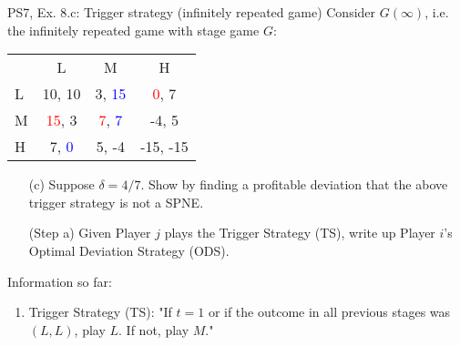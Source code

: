 \begin{frame}{PS7, Ex. 8.c: Trigger strategy (infinitely repeated game)}
    Consider $G(\infty)$, i.e. the infinitely repeated game with stage game $G$: \vspace{-6pt}
    \begin{table}
      \begin{tabular}{l|c|c|c|}
        \multicolumn{1}{c}{} & \multicolumn{1}{c}{L} & \multicolumn{1}{c}{M} & \multicolumn{1}{c}{H} \\\cline{2-4}
        L & 10, 10 & 3, \textcolor{blue}{15} & \textcolor{red}{0}, 7 \\\cline{2-4}
        M & \textcolor{red}{15}, 3 & \textcolor{red}{7}, \textcolor{blue}{7} & -4, 5 \\\cline{2-4}
        H & 7, \textcolor{blue}{0} & 5, -4 & -15, -15 \\\cline{2-4}
      \end{tabular}
    \end{table}
    \begin{itemize}
      \vspace{-4pt} \item[(c)] Suppose $\delta = 4/7$. Show by finding a profitable deviation that the above trigger strategy is not a SPNE. \vspace{-6pt}
    \end{itemize}
  \begin{multicols}{2}
    \begin{itemize}
      \item[(Step a)] Given Player $j$ plays the Trigger Strategy (TS), write up Player $i$'s Optimal Deviation Strategy (ODS).
    \end{itemize}
    \vfill\null\columnbreak
    Information so far:
    \begin{enumerate}
      \item Trigger Strategy (TS): "If $t=1$ or if the outcome in all previous stages was $(L,L)$, play $L$. If not, play $M$."
    \end{enumerate}
    \vfill\null
  \end{multicols}
\end{frame}
